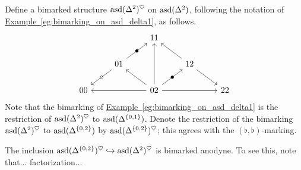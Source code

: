 \documentclass[main.tex]{subfiles}
\begin{document}
\begin{example}
  \label{eg:bimarking_on_asd_delta2}
  Define a bimarked structure $\mathrm{asd}(\Delta^{2})^{\heartsuit}$ on $\mathrm{asd}(\Delta^{2})$, following the notation of \hyperref[eg:bimarking_on_asd_delta1]{Example~\ref*{eg:bimarking_on_asd_delta1}}, as follows.
  \begin{equation*}
    \begin{tikzcd}
      && 11
      \\
      & 01
      \arrow[ur, "\bullet" marking]
      \arrow[dl, "\circ" marking]
      && 12
      \arrow[ul]
      \arrow[dr]
      \\
      00
      && 02
      \arrow[ll]
      \arrow[rr]
      \arrow[uu]
      \arrow[ur, "\bullet" marking]
      \arrow[ul]
      && 22
    \end{tikzcd}
  \end{equation*}
  Note that the bimarking of \hyperref[eg:bimarking_on_asd_delta1]{Example~\ref*{eg:bimarking_on_asd_delta1}} is the restriction of $\mathrm{asd}(\Delta^{2})^{\heartsuit}$ to $\mathrm{asd}(\Delta^{\{0, 1\}})$. Denote the restriction of the bimarking $\mathrm{asd}(\Delta^{2})^{\heartsuit}$ to $\mathrm{asd}(\Delta^{\{0, 2\}})$ by $\mathrm{asd}(\Delta^{\{0, 2\}})^{\heartsuit}$; this agrees with the $(\flat,\flat)$-marking.

  The inclusion $\mathrm{asd}(\Delta^{\{0, 2\}})^{\heartsuit} \hookrightarrow \mathrm{asd}(\Delta^{2})^{\heartsuit}$ is bimarked anodyne. To see this, note that... factorization...
\end{example}
\end{document}
